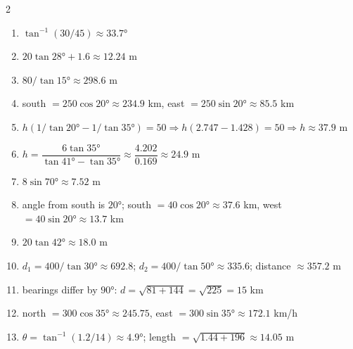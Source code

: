 \documentclass[11pt]{article}
\begin{document}
\begin{keybox}
\begin{multicols}{2}
\small
\begin{enumerate}[leftmargin=*,itemsep=3pt]
  \item $\tan^{-1}(30/45)\approx33.7°$
  \item $20\tan28°+1.6\approx12.24$ m
  \item $80/\tan15°\approx298.6$ m
  \item south $=250\cos20°\approx234.9$ km, east $=250\sin20°\approx85.5$ km
  \item $h(1/\tan20°-1/\tan35°)=50\Rightarrow h(2.747-1.428)=50\Rightarrow h\approx37.9$ m
  \item $h=\dfrac{6\tan35°}{\tan41°-\tan35°}\approx\dfrac{4.202}{0.169}\approx24.9$ m
  \item $8\sin70°\approx7.52$ m
  \item angle from south is $20°$; south $=40\cos20°\approx37.6$ km, west $=40\sin20°\approx13.7$ km
  \item $20\tan42°\approx18.0$ m
  \item $d_1=400/\tan30°\approx692.8$; $d_2=400/\tan50°\approx335.6$; distance $\approx357.2$ m
  \item bearings differ by $90°$: $d=\sqrt{81+144}=\sqrt{225}=15$ km
  \item north $=300\cos35°\approx245.75$, east $=300\sin35°\approx172.1$ km/h
  \item $\theta=\tan^{-1}(1.2/14)\approx4.9°$; length $=\sqrt{1.44+196}\approx14.05$ m
\end{enumerate}
\end{multicols}
\end{keybox}
\end{document}
